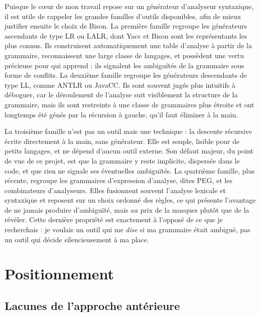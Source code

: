 Puisque le c\oe ur de mon travail repose sur un générateur d'analyseur syntaxique,
il est utile de rappeler les grandes familles d'outils disponibles, afin de mieux
justifier ensuite le choix de Bison. La première famille regroupe les générateurs
ascendants de type LR ou LALR, dont Yacc et Bison sont les représentants les plus
connus. Ils construisent automatiquement une table d'analyse à partir de la
grammaire, reconnaissent une large classe de langages, et possèdent une vertu
précieuse pour qui apprend : ils signalent les ambiguïtés de la grammaire sous
forme de conflits. La deuxième famille regroupe les générateurs descendants de
type LL, comme ANTLR ou JavaCC. Ils sont souvent jugés plus intuitifs à déboguer,
car le déroulement de l'analyse suit visiblement la structure de la grammaire,
mais ils sont restreints à une classe de grammaires plus étroite et ont
longtemps été gênés par la récursion à gauche, qu'il faut éliminer à la main.

La troisième famille n'est pas un outil mais une technique : la descente récursive
écrite directement à la main, sans générateur. Elle est souple, lisible pour de
petits langages, et ne dépend d'aucun outil externe. Son défaut majeur, du point
de vue de ce projet, est que la grammaire y reste implicite, dispersée dans le
code, et que rien ne signale ses éventuelles ambiguïtés. La quatrième famille,
plus récente, regroupe les grammaires d'expression d'analyse, dites PEG, et les
combinateurs d'analyseurs. Elles fusionnent souvent l'analyse lexicale et
syntaxique et reposent sur un choix ordonné des règles, ce qui présente l'avantage
de ne jamais produire d'ambiguïté, mais au prix de la masquer plutôt que de la
révéler. Cette dernière propriété est exactement à l'opposé de ce que je
recherchais : je voulais un outil qui me \emph{dise} si ma grammaire était
ambiguë, pas un outil qui décide silencieusement à ma place.

\section{Positionnement}

\subsection{Lacunes de l'approche antérieure}

